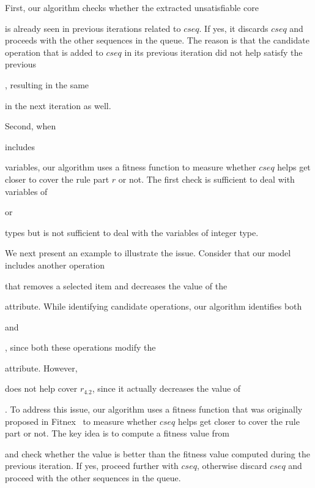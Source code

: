 First, our algorithm checks whether the extracted unsatisfiable core \subject{ucore}
is already seen in previous iterations related to $cseq$. If yes, it discards $cseq$
and proceeds with the other sequences in the queue. The reason is that the candidate
operation that is added to $cseq$ in its previous iteration did not help satisfy
the previous \subject{ucore}, resulting in the same \subject{ucore} in the next
iteration as well.

Second, when \subject{ucore} includes \subject{integer} variables,
our algorithm uses a fitness function to measure whether $cseq$ helps
get closer to cover the rule part $r$ or not. The first check is sufficient to deal
with variables of \subject{boolean} or \subject{enum} types but is not
sufficient to deal with the variables of {integer} type. 

We next present an
example to illustrate the issue. Consider that our model includes another
operation \subject{RemoveItemFromOrder} that removes a selected item and
decreases the value of the \subject{Total} attribute. While identifying candidate
operations, our algorithm identifies both \subject{AddItemToOrder} and
\subject{RemoveItemFromOrder}, since both these operations modify the \subject{Total}
attribute. However, \subject{RemoveItemFromOrder} does not help cover $r_{4.2}$,
since it actually decreases the value of \subject{Total}. To address this issue,
our algorithm uses a fitness function that was originally proposed in
Fitnex~\cite{xie09:fitness} to measure whether $cseq$ helps get closer
to cover the rule part or not. The key idea is to compute a fitness value
from \subject{ucore} and check whether the value is better than the fitness
value computed during the previous iteration. If yes, proceed further 
with $cseq$, otherwise discard $cseq$ and proceed with the other sequences in the queue.

